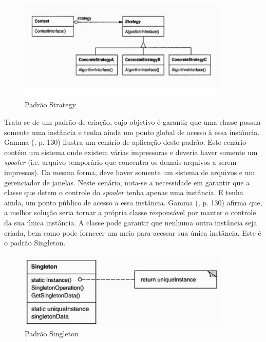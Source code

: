 \begin{figure}[h]
\centering
\label{f07}
\includegraphics[width=0.9\textwidth]{figuras/f07}
\caption{Padrão Strategy}
\end{figure}

Trata-se de um padrão de criação, cujo objetivo é garantir que uma classe possua somente uma instância e tenha ainda um ponto global de acesso à essa instância. Gamma (\citeyear{gamma2000}, p. 130) ilustra um cenário de aplicação deste padrão. Este cenário contém um sistema onde existem várias impressoras e deveria haver somente um \textit{spooler} (i.e. arquivo temporário que concentra os demais arquivos a serem impressos). Da mesma forma, deve haver somente um sistema de arquivos e um gerenciador de janelas. Neste cenário, nota-se a necessidade em garantir que a classe que detem o controle do \textit{spooler} tenha apenas uma instância. E tenha ainda, um ponto público de acesso a essa instância. Gamma (\citeyear{gamma2000}, p. 130) afirma que, a melhor solução seria tornar a própria classe responsável por manter o controle da sua única instância. A classe pode garantir que nenhuma outra instância seja criada, bem como pode fornecer um meio para acessar sua única instância. Este é o padrão Singleton.

\begin{figure}[h]
\centering
\label{f08}
\includegraphics[width=0.9\textwidth]{figuras/singleton}
\caption{Padrão Singleton}
\end{figure}

